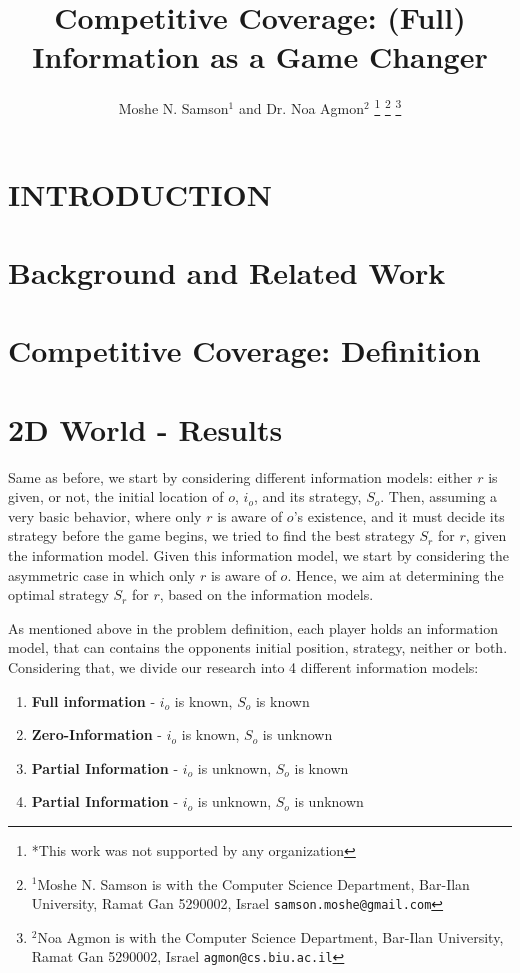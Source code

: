 \documentclass[letterpaper, 10 pt, conference]{ieeeconf}  %
\title{\LARGE \bf
Competitive  Coverage:  (Full)  Information  as  a  Game  Changer
}
\author{Moshe N. Samson$^{1}$ and Dr. Noa Agmon$^{2}$%
\thanks{*This work was not supported by any organization}%
\thanks{$^{1}$Moshe N. Samson is with the Computer Science Department,
        Bar-Ilan University, Ramat Gan 5290002, Israel
        {\tt\small samson.moshe@gmail.com}}%
\thanks{$^{2}$Noa Agmon is with the Computer Science Department, Bar-Ilan University, Ramat Gan 5290002, Israel
        {\tt\small agmon@cs.biu.ac.il}}%
}
\newcommand\rob{\ensuremath{r}\xspace}
\newcommand\opp{\ensuremath{o}\xspace}
\begin{document}
\maketitle
\thispagestyle{empty}
\pagestyle{empty}


\begin{abstract}



\end{abstract}


\section{INTRODUCTION}



\section{Background and Related Work}


\section{Competitive Coverage: Definition}


\section{2D World - Results}
Same as before, we start by considering different information models: either \rob is given, or not, the initial location of \opp, $i_\opp$, and its strategy, $S_\opp$. Then, assuming a very basic behavior, where only \rob is aware of \opp's existence, and it must decide its strategy before the game begins, we tried to find the best strategy $S_\rob$ for \rob, given the information model.
Given this information model, we start by considering the asymmetric case in which only \rob is aware of \opp. Hence, we aim at determining the optimal strategy $S_\rob$ for \rob, based on the information models.

As mentioned above in the problem definition, each player holds an information model, that can contains the opponents initial position, strategy, neither or both. Considering that, we divide our research into 4 different information models:
\begin{enumerate}
\item \textbf{Full information} - $i_\opp$ is known, $S_\opp$ is known
\item \textbf{Zero-Information} - $i_\opp$ is known, $S_\opp$ is unknown
\item \textbf{Partial Information} -  $i_\opp$ is unknown, $S_\opp$ is known
\item \textbf{Partial Information} - $i_\opp$ is unknown, $S_\opp$ is unknown
\end{enumerate}
\end{document}

